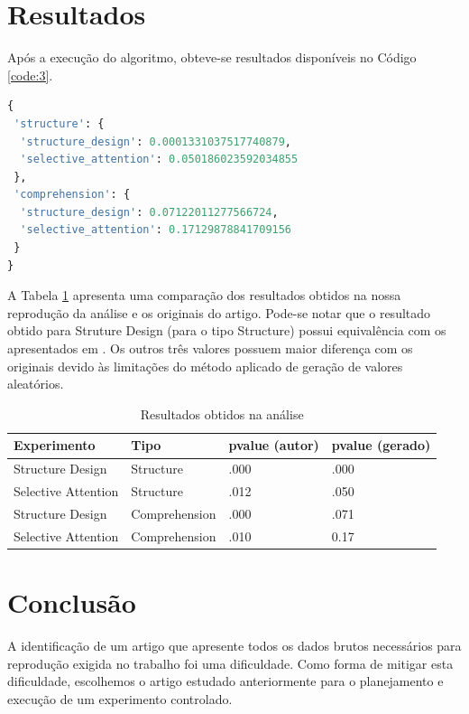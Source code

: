 \documentclass[12pt]{article}
\begin{document}
\section{Resultados}

Após a execução do algoritmo, obteve-se resultados disponíveis no Código \ref{code:3}.

\begin{lstlisting}[caption={Saída do script},captionpos=b,frame=single,language=python,label={code:3}]
{
 'structure': {
  'structure_design': 0.0001331037517740879,
  'selective_attention': 0.050186023592034855
 },
 'comprehension': {
  'structure_design': 0.07122011277566724,
  'selective_attention': 0.17129878841709156
 }
}
\end{lstlisting}

A Tabela \ref{tab:resultados} apresenta uma comparação dos resultados obtidos na nossa reprodução da análise e os originais do artigo. Pode-se notar que o resultado obtido para Struture Design (para o tipo Structure) possui equivalência com os apresentados em \cite{JIN2013248}. Os outros três valores possuem maior diferença com os originais devido às limitações do método aplicado de geração de valores aleatórios.

\begin{table}[!htb]
  \centering
	\begin{tabular}{|l|l|l|l|}
		\hline
		\textbf{Experimento} & \textbf{Tipo} & \textbf{pvalue (autor)} & \textbf{pvalue (gerado)} \\ \hline
		Structure Design & Structure & .000 & .000 \\ \hline
		Selective Attention & Structure & .012 & .050 \\ \hline
		Structure Design & Comprehension & .000 & .071 \\ \hline
		Selective Attention & Comprehension & .010 & 0.17 \\ \hline
		\end{tabular}
  \caption{Resultados obtidos na análise}
  \label{tab:resultados}
\end{table}

\section{Conclusão}

A identificação de um artigo que apresente todos os dados brutos necessários para reprodução exigida no trabalho foi uma dificuldade. Como forma de mitigar esta dificuldade, escolhemos o artigo estudado anteriormente para o planejamento e execução de um experimento controlado.
\end{document}
